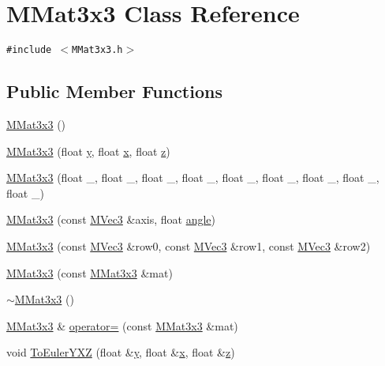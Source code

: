 \hypertarget{class_m_mat3x3}{
\section{MMat3x3 Class Reference}
\label{class_m_mat3x3}
}
{\tt \#include $<$MMat3x3.h$>$}

\subsection*{Public Member Functions}
\begin{CompactItemize}
\item 
\hyperlink{class_m_mat3x3_f7123b5212981cb6a5267a8dbf8e86ec}{MMat3x3} ()
\item 
\hyperlink{class_m_mat3x3_f751a2f8378abde20ffe3fcfc39a726b}{MMat3x3} (float \hyperlink{wglext_8h_9298c7ad619074f5285b32c6b72bfdea}{y}, float \hyperlink{wglext_8h_d77deca22f617d3f0e0eb786445689fc}{x}, float \hyperlink{glext__bak_8h_5b27107fca91cf19a778530405575b37}{z})
\item 
\hyperlink{class_m_mat3x3_f53f2aa6c4d47b4f44580574299800ef}{MMat3x3} (float \_, float \_, float \_, float \_, float \_, float \_, float \_, float \_, float \_)
\item 
\hyperlink{class_m_mat3x3_f3b19cba8bce9dd0916fdc214faee6cb}{MMat3x3} (const \hyperlink{class_m_vec3}{MVec3} \&axis, float \hyperlink{glext_8h_9e06c1f76a20fed54ca742cd25cb02c4}{angle})
\item 
\hyperlink{class_m_mat3x3_5940f6a8f9f4a0d11fd737a9b8f78c85}{MMat3x3} (const \hyperlink{class_m_vec3}{MVec3} \&row0, const \hyperlink{class_m_vec3}{MVec3} \&row1, const \hyperlink{class_m_vec3}{MVec3} \&row2)
\item 
\hyperlink{class_m_mat3x3_be15ae144f6155954faf29c683f9fe72}{MMat3x3} (const \hyperlink{class_m_mat3x3}{MMat3x3} \&mat)
\item 
\hyperlink{class_m_mat3x3_b08b8249982271bc69924bbb325037ba}{$\sim$MMat3x3} ()
\item 
\hyperlink{class_m_mat3x3}{MMat3x3} \& \hyperlink{class_m_mat3x3_893b3d2e337be1b09d3d694c23c0c3e6}{operator=} (const \hyperlink{class_m_mat3x3}{MMat3x3} \&mat)
\item 
void \hyperlink{class_m_mat3x3_10714e78ed687e30e915ef75c34c5cbb}{ToEulerYXZ} (float \&\hyperlink{wglext_8h_9298c7ad619074f5285b32c6b72bfdea}{y}, float \&\hyperlink{wglext_8h_d77deca22f617d3f0e0eb786445689fc}{x}, float \&\hyperlink{glext__bak_8h_5b27107fca91cf19a778530405575b37}{z})

\end{CompactItemize}
